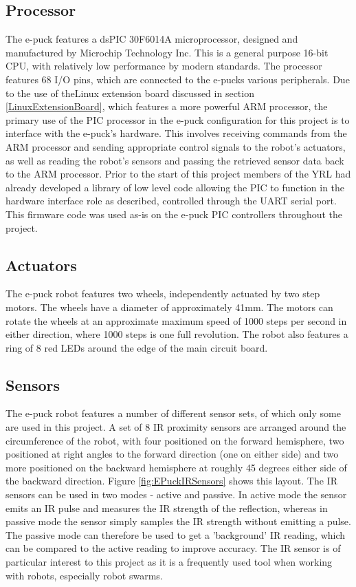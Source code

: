 \subsection{Processor}
The e-puck features a dsPIC 30F6014A microprocessor, designed and manufactured by Microchip Technology Inc. This is a general purpose 16-bit CPU, with relatively low performance by modern standards. The processor features 68 I/O pins, which are connected to the e-pucks various peripherals. Due to the use of theLinux extension board discussed in section \ref{LinuxExtensionBoard}, which features a more powerful ARM processor, the primary use of the PIC processor in the e-puck configuration for this project is to interface with the e-puck's hardware. This involves receiving commands from the ARM processor and sending appropriate control signals to the robot's actuators, as well as reading the robot's sensors and passing the retrieved sensor data back to the ARM processor. Prior to the start of this project members of the YRL had already developed a library of low level code allowing the PIC to function in the hardware interface role as described, controlled through the UART serial port. This firmware code was used as-is on the e-puck PIC controllers throughout the project.


\subsection{Actuators}
The e-puck robot features two wheels, independently actuated by two step motors. The wheels have a diameter of approximately 41mm. The motors can rotate the wheels at an approximate maximum speed of 1000 steps per second in either direction, where 1000 steps is one full revolution. The robot also features a ring of 8 red LEDs around the edge of the main circuit board. 


\subsection{Sensors}
The e-puck robot features a number of different sensor sets, of which only some are used in this project. A set of 8 IR proximity sensors are arranged around the circumference of the robot, with four positioned on the forward hemisphere, two positioned at right angles to the forward direction (one on either side) and two more positioned on the backward hemisphere at roughly 45 degrees either side of the backward direction. Figure \ref{fig:EPuckIRSensors} shows this layout. The IR sensors can be used in two modes - active and passive. In active mode the sensor emits an IR pulse and measures the IR strength of the reflection, whereas in passive mode the sensor simply samples the IR strength without emitting a pulse. The passive mode can therefore be used to get a 'background' IR reading, which can be compared to the active reading to improve accuracy. The IR sensor is of particular interest to this project as it is a frequently used tool when working with robots, especially robot swarms.

